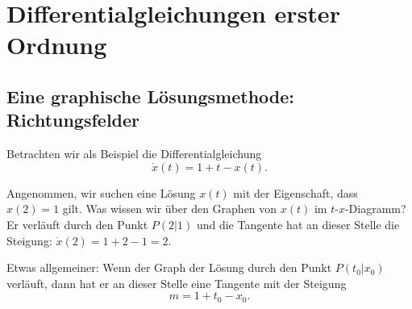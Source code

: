 
\section{Differentialgleichungen erster Ordnung}

\subsection{Eine graphische Lösungsmethode: Richtungsfelder}

Betrachten wir als Beispiel die Differentialgleichung
\[
    \dot{x}(t)=1+t-x(t).
\]

Angenommen, wir suchen eine Lösung \(x(t)\) mit der Eigenschaft,
dass \(x(2)=1\) gilt. Was wissen wir über den Graphen von
\(x(t)\) im \(t\)-\(x\)-Diagramm? Er verläuft durch den Punkt
\(P(2|1)\) und die Tangente hat an dieser Stelle die Steigung:
\(\dot{x}(2)=1+2-1=2\).

Etwas allgemeiner: Wenn der Graph der Lösung durch den Punkt
\(P(t_0|x_0)\) verläuft, dann hat er an dieser Stelle eine
Tangente mit der Steigung
\[
    m=1+t_0-x_0.
\]

